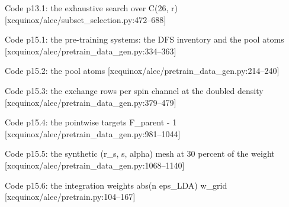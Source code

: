 \begin{frame}[allowframebreaks]{Code p13.1: the exhaustive search over C(26, r) [xcquinox/alec/subset\_selection.py:472--688]}
\label{code:p13_1_the_exhaustive_search_over_c_26_r}
\end{frame}
\begin{frame}[allowframebreaks]{Code p15.1: the pre-training systems: the DFS inventory and the pool atoms [xcquinox/alec/pretrain\_data\_gen.py:334--363]}
\label{code:p15_1_the_pre_training_systems_the_dfs_invento}
\end{frame}
\begin{frame}[allowframebreaks]{Code p15.2: the pool atoms [xcquinox/alec/pretrain\_data\_gen.py:214--240]}
\label{code:p15_2_the_pool_atoms}
\end{frame}
\begin{frame}[allowframebreaks]{Code p15.3: the exchange rows per spin channel at the doubled density [xcquinox/alec/pretrain\_data\_gen.py:379--479]}
\label{code:p15_3_the_exchange_rows_per_spin_channel_at_th}
\end{frame}
\begin{frame}[allowframebreaks]{Code p15.4: the pointwise targets F\_parent - 1 [xcquinox/alec/pretrain\_data\_gen.py:981--1044]}
\label{code:p15_4_the_pointwise_targets_f_parent_1}
\end{frame}
\begin{frame}[allowframebreaks]{Code p15.5: the synthetic (r\_s, s, alpha) mesh at 30 percent of the weight [xcquinox/alec/pretrain\_data\_gen.py:1068--1140]}
\label{code:p15_5_the_synthetic_r_s_s_alpha_mesh_at_30_per}
\end{frame}
\begin{frame}[allowframebreaks]{Code p15.6: the integration weights abs(n eps\_LDA) w\_grid [xcquinox/alec/pretrain.py:104--167]}
\label{code:p15_6_the_integration_weights_abs_n_eps_lda_w}
\end{frame}
